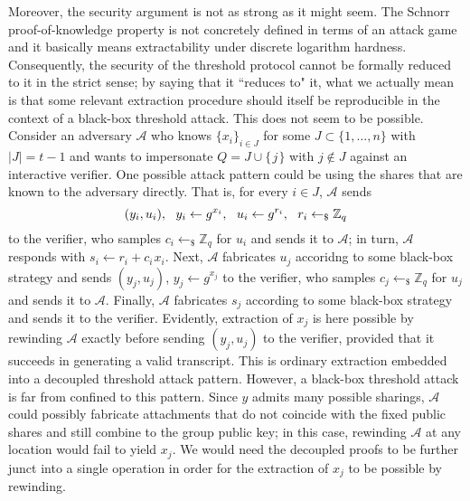 \documentclass[psamsfonts, reqno]{amsart}
\theoremstyle{definition}
\theoremstyle{remark}
\numberwithin{equation}{section}
\begin{document}
Moreover, the security argument is not as strong
as it might seem. The Schnorr proof-of-knowledge
property is not concretely defined in terms of an attack game
and it basically means extractability under discrete logarithm
hardness. Consequently, the security of the threshold protocol
cannot be formally reduced to it in the strict sense;
by saying that it ``reduces to" it,
what we actually mean is that
some relevant extraction procedure
should itself be reproducible in the context of
a black-box threshold attack.
This does not seem to be possible.
Consider an adversary $\mathcal{A}$ who knows
$\{x_i\}_{i \in J}$
for some $J \subset \{1, \dots, n\}$ with $|J| = t - 1$
and wants to impersonate
$Q = J \cup \{\hspace{1pt}j\hspace{1pt}\}$
with $j \not \in J$ against an interactive verifier.
One possible attack pattern could
be using the shares that are known to the adversary directly.
That is, for every $i \in J$,
$\mathcal{A}$ sends
\vspace{5pt}
\begin{equation*}
(y_i, u_i),
\ \ y_i \leftarrow g ^ {x_i},
\ \ u_i \leftarrow g ^ {r_i},
\ \ r_i \leftarrow_\$ \mathbb{Z}_q
\vspace{5pt}
\end{equation*}
to the verifier,
who samples $c_i \leftarrow_\$ \mathbb{Z}_q$
for $u_i$
and sends it to $\mathcal{A}$;
in turn, $\mathcal{A}$ responds
with $s_i \leftarrow r_i + c_i\hspace{1pt}x_i$.
Next, $\mathcal{A}$ fabricates $u_j$
accoridng to some black-box strategy and sends
$(y_j, u_j)$, $y_j \leftarrow g ^ {x_j}$ to the verifier,
who samples $c_j \leftarrow_\$ \mathbb{Z}_q$ for $u_j$
and sends it to $\mathcal{A}$.
Finally, $\mathcal{A}$ fabricates $s_j$
according to some black-box strategy
and sends it to the verifier.
Evidently, extraction of $x_j$ is here possible
by rewinding $\mathcal{A}$
exactly before sending $(y_j, u_j)$ to the verifier,
provided that it
succeeds in generating a valid transcript.
This is ordinary extraction
embedded into a decoupled threshold attack pattern.
However, a black-box threshold attack
is far from confined to this pattern.
Since $y$ admits many possible sharings,
$\mathcal{A}$ could possibly fabricate attachments
that do not coincide with the fixed public shares
and still combine to the group public key;
in this case, rewinding $\mathcal{A}$ at any location
would fail to yield $x_j$.
We would need the decoupled proofs to
be further junct into a single operation
in order for the extraction of $x_j$
to be possible by rewinding.
\end{document}
